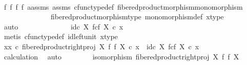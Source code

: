 \begin{isabellebody}
\ \ \ \ \ \ \ \ \isamarkupfalse%
\ f{}{}\ f{}\ f{}\ f{}\ a{\isacharunderscore}{\kern0pt}assms\ assms{\isacharparenleft}{\kern0pt}{}{\isacharparenright}{\kern0pt}\ cfunc{\isacharunderscore}{\kern0pt}type{\isacharunderscore}{\kern0pt}def\ fibered{\isacharunderscore}{\kern0pt}product{\isacharunderscore}{\kern0pt}morphism{\isacharunderscore}{\kern0pt}monomorphism\ \isanewline
\ \ \ \ \ \ \ \ \ \ \ \ \ \ fibered{\isacharunderscore}{\kern0pt}product{\isacharunderscore}{\kern0pt}morphism{\isacharunderscore}{\kern0pt}type\ monomorphism{\isacharunderscore}{\kern0pt}def\ x{\isacharunderscore}{\kern0pt}type\isanewline
\ \ \ \ \ \ \ \ \isamarkupfalse%
\ auto\isanewline
\ \ \ \ \isamarkupfalse%
\isanewline
\ \ \ \ \isamarkupfalse%
\ \isamarkupfalse%
\ {\isachardoublequoteopen}{\isachardot}{\kern0pt}{\isachardot}{\kern0pt}{\isachardot}{\kern0pt}\ {\isacharequal}{\kern0pt}\ id\isactrlsub c\ {\isacharparenleft}{\kern0pt}X\ \isactrlbsub f\isactrlesub {\isasymtimes}\isactrlsub c\isactrlbsub f\isactrlesub \ X{\isacharparenright}{\kern0pt}\ {\isasymcirc}\isactrlsub c\ x{\isachardoublequoteclose}\isanewline
\ \ \ \ \ \ \isamarkupfalse%
\ {\isacharparenleft}{\kern0pt}metis\ cfunc{\isacharunderscore}{\kern0pt}type{\isacharunderscore}{\kern0pt}def\ id{\isacharunderscore}{\kern0pt}left{\isacharunderscore}{\kern0pt}unit\ x{\isacharunderscore}{\kern0pt}type{\isacharparenright}{\kern0pt}\isanewline
\ \ \ \ \isamarkupfalse%
\ \isamarkupfalse%
\ {\isachardoublequoteopen}{\isacharparenleft}{\kern0pt}xx\ {\isasymcirc}\isactrlsub c\ fibered{\isacharunderscore}{\kern0pt}product{\isacharunderscore}{\kern0pt}right{\isacharunderscore}{\kern0pt}proj\ X\ f\ f\ X{\isacharparenright}{\kern0pt}\ {\isasymcirc}\isactrlsub c\ x\ {\isacharequal}{\kern0pt}\ id\isactrlsub c\ {\isacharparenleft}{\kern0pt}X\ \isactrlbsub f\isactrlesub {\isasymtimes}\isactrlsub c\isactrlbsub f\isactrlesub \ X{\isacharparenright}{\kern0pt}\ {\isasymcirc}\isactrlsub c\ x{\isachardoublequoteclose}\isanewline
\ \ \ \ \ \ \isamarkupfalse%
\ calculation\ \isamarkupfalse%
\ auto\isanewline
\ \ \isamarkupfalse%
\isanewline
\ \isanewline
\ \ \isamarkupfalse%
\ {\isachardoublequoteopen}isomorphism\ {\isacharparenleft}{\kern0pt}fibered{\isacharunderscore}{\kern0pt}product{\isacharunderscore}{\kern0pt}right{\isacharunderscore}{\kern0pt}proj\ X\ f\ f\ X{\isacharparenright}{\kern0pt}{\isachardoublequoteclose}\isanewline

\end{isabellebody}
